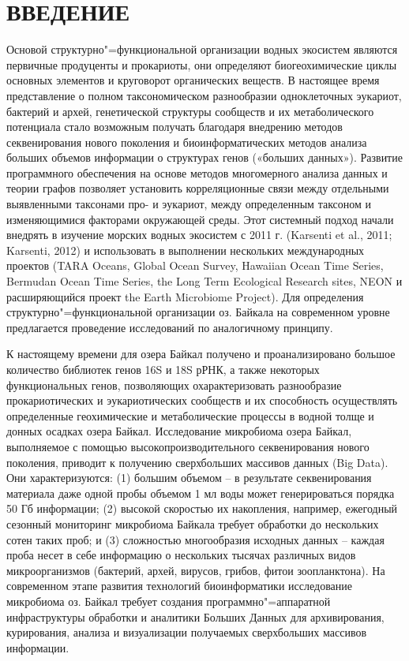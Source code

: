 \documentclass[a4paper,12pt,openany,final]{extreport}
\begin{document}
\chapter*{ВВЕДЕНИЕ}

Основой структурно"=функциональной организации водных экосистем являются первичные продуценты и прокариоты, они определяют биогеохимические циклы основных элементов и круговорот органических веществ. В настоящее время представление о полном таксономическом разнообразии одноклеточных эукариот, бактерий и архей, генетической структуры сообществ и их метаболического потенциала стало возможным получать благодаря внедрению методов секвенирования нового поколения и биоинформатических методов анализа больших объемов информации о структурах генов («больших данных»). Развитие программного обеспечения на основе методов многомерного анализа данных и теории графов позволяет установить корреляционные связи между отдельными выявленными таксонами про- и эукариот, между определенным таксоном и изменяющимися факторами окружающей среды. Этот системный подход начали внедрять в изучение морских водных экосистем с 2011 г. (Karsenti et al., 2011; Karsenti, 2012) и использовать в выполнении нескольких международных проектов (TARA Oceans, Global Ocean Survey, Hawaiian Ocean Time Series, Bermudan Ocean Time Series, the Long Term Ecological Research sites, NEON и расширяющийся проект the Earth Microbiome Project). Для определения структурно"=функциональной организации оз. Байкала на современном уровне предлагается проведение исследований по аналогичному принципу.

К настоящему времени для озера Байкал получено и проанализировано большое количество библиотек генов 16S и 18S рРНК, а также некоторых функциональных генов, позволяющих охарактеризовать разнообразие прокариотических и эукариотических сообществ и их способность осуществлять определенные геохимические и метаболические процессы в водной толще и донных осадках озера Байкал. Исследование микробиома озера Байкал, выполняемое с помощью высокопроизводительного секвенирования нового поколения, приводит к получению сверхбольших массивов данных (Big Data). Они характеризуются: (1) большим объемом -- в результате секвенирования материала даже одной пробы объемом 1 мл воды может генерироваться порядка 50 Гб информации; (2) высокой скоростью их накопления, например, ежегодный сезонный мониторинг микробиома Байкала требует обработки до нескольких сотен таких проб; и (3) сложностью многообразия исходных данных -- каждая проба несет в себе информацию о нескольких тысячах различных видов микроорганизмов (бактерий, архей, вирусов, грибов, фитои зоопланктона). На современном этапе развития технологий биоинформатики исследование микробиома оз. Байкал требует создания программно"=аппаратной инфраструктуры обработки и аналитики Больших Данных для архивирования, курирования, анализа и визуализации получаемых сверхбольших массивов информации.
\end{document}
